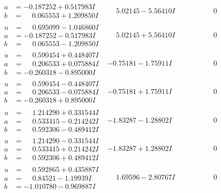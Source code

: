 \documentclass[1p]{elsarticle_modified}
\theoremstyle{definition}
\begin{document}
$$\begin{array}{c|c|c}
\begin{aligned}
a &= -0.187252 + 0.517983 I \\
b &= \phantom{-}0.065553 + 1.209850 I\end{aligned}
 & \phantom{-}5.02145 - 5.56410 I & \phantom{-0.000000 } 0 \\ \hline\begin{aligned}
u &= \phantom{-}0.695099 - 1.046860 I \\
a &= -0.187252 - 0.517983 I \\
b &= \phantom{-}0.065553 - 1.209850 I\end{aligned}
 & \phantom{-}5.02145 + 5.56410 I & \phantom{-0.000000 } 0 \\ \hline\begin{aligned}
u &= \phantom{-}0.590454 + 0.448407 I \\
a &= \phantom{-}0.206533 + 0.075884 I \\
b &= -0.260318 - 0.895000 I\end{aligned}
 & -0.75181 - 1.75911 I & \phantom{-0.000000 } 0 \\ \hline\begin{aligned}
u &= \phantom{-}0.590454 - 0.448407 I \\
a &= \phantom{-}0.206533 - 0.075884 I \\
b &= -0.260318 + 0.895000 I\end{aligned}
 & -0.75181 + 1.75911 I & \phantom{-0.000000 } 0 \\ \hline\begin{aligned}
u &= \phantom{-}1.214290 + 0.331544 I \\
a &= \phantom{-}0.533415 - 0.214242 I \\
b &= \phantom{-}0.592306 - 0.489412 I\end{aligned}
 & -1.83287 - 1.28802 I & \phantom{-0.000000 } 0 \\ \hline\begin{aligned}
u &= \phantom{-}1.214290 - 0.331544 I \\
a &= \phantom{-}0.533415 + 0.214242 I \\
b &= \phantom{-}0.592306 + 0.489412 I\end{aligned}
 & -1.83287 + 1.28802 I & \phantom{-0.000000 } 0 \\ \hline\begin{aligned}
u &= \phantom{-}0.592865 + 0.435887 I \\
a &= \phantom{-}0.84521 - 1.19939 I \\
b &= -1.010780 - 0.969887 I\end{aligned}
 & \phantom{-}1.69596 - 2.80767 I & \phantom{-0.000000 } 0 \\ \hline\begin{aligned}

\end{aligned}
\end{array}$$
\end{document}
